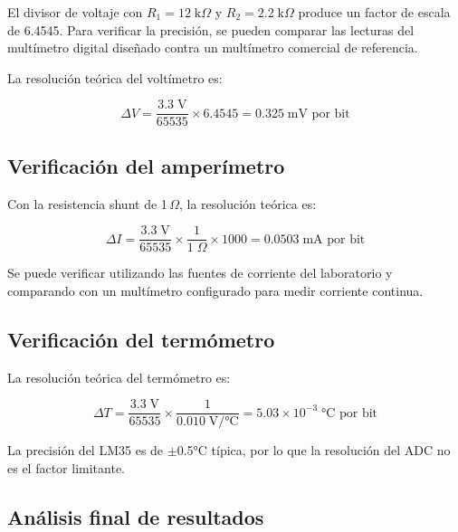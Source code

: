 \documentclass[letterpaper,12pt]{article}
\begin{document}
    El divisor de voltaje con $R_1 = 12\;\text{k}\Omega$ y $R_2 = 2.2\;\text{k}\Omega$ produce un factor de escala de 6.4545. Para verificar la precisión, se pueden comparar las lecturas del multímetro digital diseñado contra un multímetro comercial de referencia.

    La resolución teórica del voltímetro es:

    \begin{equation}
        \Delta V = \frac{3.3\;\text{V}}{65535} \times 6.4545 = 0.325\;\text{mV por bit}
    \end{equation}

    \subsection{Verificación del amperímetro}

    Con la resistencia shunt de 1\,$\Omega$, la resolución teórica es:

    \begin{equation}
        \Delta I = \frac{3.3\;\text{V}}{65535} \times \frac{1}{1\;\Omega} \times 1000 = 0.0503\;\text{mA por bit}
    \end{equation}

    Se puede verificar utilizando las fuentes de corriente del laboratorio y comparando con un multímetro configurado para medir corriente continua.

    \subsection{Verificación del termómetro}

    La resolución teórica del termómetro es:

    \begin{equation}
        \Delta T = \frac{3.3\;\text{V}}{65535} \times \frac{1}{0.010\;\text{V/°C}} = 5.03 \times 10^{-3}\;\text{°C por bit}
    \end{equation}

    La precisión del LM35 es de $\pm$0.5°C típica, por lo que la resolución del ADC no es el factor limitante.

    \subsection{Análisis final de resultados}
\end{document}
